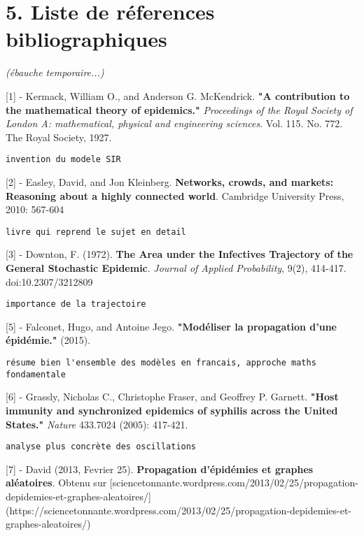 \documentclass{article}
\begin{document}
\section*{5. Liste de réferences bibliographiques}
\textit{(ébauche temporaire...)}

[1] -  Kermack, William O., and Anderson G. McKendrick. \textbf{"A contribution to the mathematical theory of epidemics."} \textit{Proceedings of the Royal Society of London A: mathematical, physical and engineering sciences}. Vol. 115. No. 772. The Royal Society, 1927.


\begin{verbatim}
invention du modele SIR
\end{verbatim}


[2] -  Easley, David, and Jon Kleinberg. \textbf{Networks, crowds, and markets: Reasoning about a highly connected world}. Cambridge University Press, 2010: 567-604


\begin{verbatim}
livre qui reprend le sujet en detail
\end{verbatim}


[3] - Downton, F. (1972). \textbf{The Area under the Infectives Trajectory of the General Stochastic Epidemic}. \textit{Journal of Applied Probability}, 9(2), 414-417. doi:10.2307/3212809


\begin{verbatim}
importance de la trajectoire
\end{verbatim}


[5] - Falconet, Hugo, and Antoine Jego. \textbf{"Modéliser la propagation d’une épidémie."} (2015).


\begin{verbatim}
résume bien l'ensemble des modèles en francais, approche maths fondamentale
\end{verbatim}


[6] - Grassly, Nicholas C., Christophe Fraser, and Geoffrey P. Garnett. \textbf{"Host immunity and synchronized epidemics of syphilis across the United States."} \textit{Nature} 433.7024 (2005): 417-421.


\begin{verbatim}
analyse plus concrète des oscillations
\end{verbatim}


[7] - David (2013, Fevrier 25). \textbf{Propagation d'épidémies et graphes aléatoires}. Obtenu sur [sciencetonnante.wordpress.com/2013/02/25/propagation-depidemies-et-graphes-aleatoires/](https://sciencetonnante.wordpress.com/2013/02/25/propagation-depidemies-et-graphes-aleatoires/)
\end{document}
